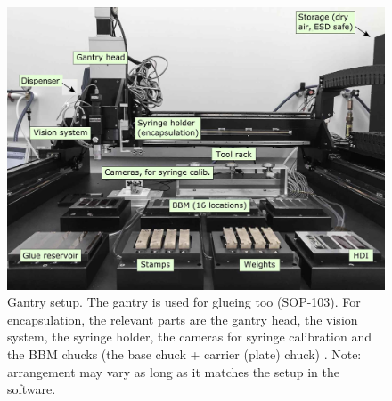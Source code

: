 \documentclass[12pt]{unlsilabsop}
\begin{document}
\begin{figure}[ht]
    \begin{center}
        \includegraphics[width=\textwidth]{img/gantryFull16labeled.jpg}
        \caption{Gantry setup. The gantry is used for glueing too (SOP-103). For encapsulation, the relevant parts are the gantry head, the vision system, the syringe holder, the cameras for syringe calibration and the BBM chucks (the base chuck + carrier (plate) chuck) . Note: arrangement may vary as long as it matches the setup in the software.}
        \label{fig:gantryFullLabeled}
    \end{center}
\end{figure}
\end{document}
